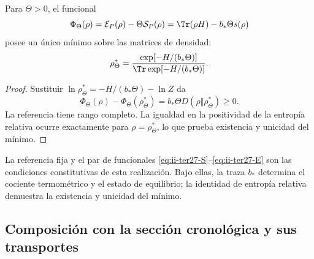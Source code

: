 \begin{corollary}
\label{cor:ii-ter27-variational}
Para $\Theta>0$, el funcional
\[
 \Phi_\Theta(\rho)=\mathcal E_P(\rho)-\Theta\mathcal S_P(\rho)
 =\Tr(\rho H)-b_*\Theta s(\rho)
\]
posee un único mínimo sobre las matrices de densidad:
\begin{equation}
 \rho_\Theta^*=
 \frac{\exp[-H/(b_*\Theta)]}{\Tr\exp[-H/(b_*\Theta)]}.
 \label{eq:ii-ter27-minimum}
\end{equation}
\end{corollary}
\begin{proof}
Sustituir $\ln\rho_\Theta^*=-H/(b_*\Theta)-\ln Z$ da
\[
 \Phi_\Theta(\rho)-\Phi_\Theta(\rho_\Theta^*)
 =b_*\Theta D(\rho\Vert\rho_\Theta^*)\ge0.
\]
La referencia tiene rango completo. La igualdad en la positividad de la
entropía relativa ocurre exactamente para $\rho=\rho_\Theta^*$,
lo que prueba existencia y unicidad del mínimo.
\end{proof}

La referencia fija y el par de funcionales
\eqref{eq:ii-ter27-S}--\eqref{eq:ii-ter27-E} son las condiciones
constitutivas de esta realización. Bajo ellas, la traza $b_*$ determina
el cociente termométrico y el estado de equilibrio; la identidad de
entropía relativa demuestra la existencia y unicidad del mínimo.

\subsection{Composición con la sección cronológica y sus transportes}
\label{subsec:ii-ter27-map}


